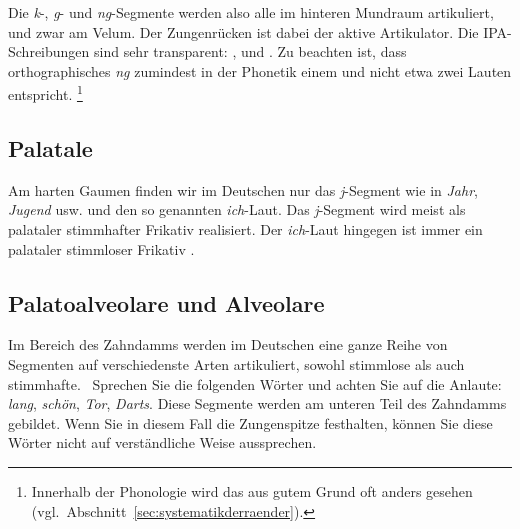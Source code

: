 Die \textit{k}-, \textit{g}- und \textit{ng}-Segmente werden also alle im hinteren Mundraum artikuliert, und zwar am Velum.
Der Zungenrücken ist dabei der aktive Artikulator.
Die IPA-Schreibungen sind sehr transparent: \textipa{[k]}, \textipa{[g]} und \textipa{[N]}.
Zu beachten ist, dass orthographisches \textit{ng} zumindest in der Phonetik einem und nicht etwa zwei Lauten entspricht.%
\footnote{Innerhalb der Phonologie wird das aus gutem Grund oft anders gesehen (vgl.\ Abschnitt~\ref{sec:systematikderraender}).}

\subsection{Palatale}


Am harten Gaumen finden wir im Deutschen nur das \textit{j}-Segment wie in \textit{Jahr}, \textit{Jugend} usw. und den so genannten \textit{ich}-Laut.
Das \textit{j}-Segment wird meist als palataler stimmhafter Frikativ \textipa{[J]} realisiert.
Der \textit{ich}-Laut hingegen ist immer ein palataler stimmloser Frikativ \textipa{[\c{c}]}.

\subsection{Palatoalveolare und Alveolare}

\label{sec:palatoalveolarealveolare}


Im Bereich des Zahndamms werden im Deutschen eine ganze Reihe von Segmenten auf verschiedenste Arten artikuliert, sowohl stimmlose als auch stimmhafte.
\TuBegin~Sprechen Sie die folgenden Wörter und achten Sie auf die Anlaute: \textit{lang}, \textit{schön}, \textit{Tor}, \textit{Darts}.
Diese Segmente werden am unteren Teil des Zahndamms gebildet.
Wenn Sie in diesem Fall die Zungenspitze festhalten, können Sie diese Wörter nicht auf verständliche Weise aussprechen.

